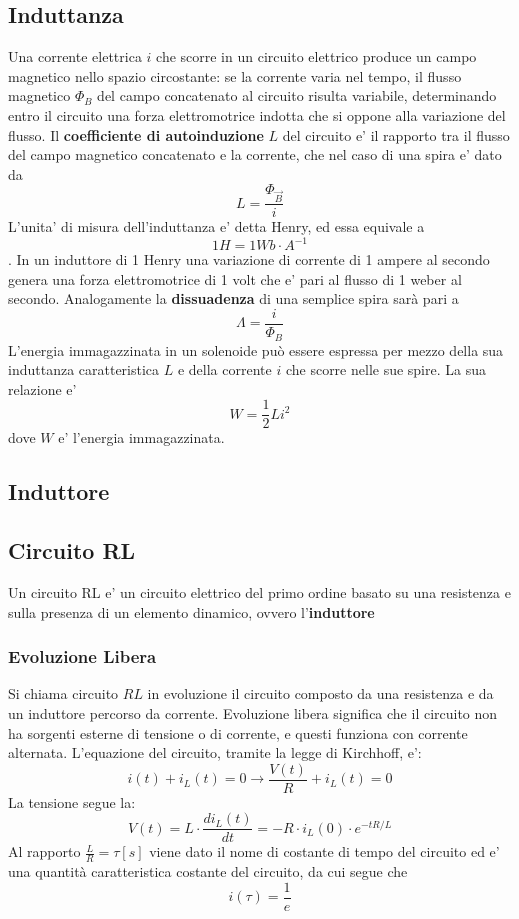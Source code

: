 \documentclass[a4paper, 10pt]{article}
\begin{document}
		\subsection{Induttanza}
			Una corrente elettrica $i$ che scorre in un circuito elettrico produce un campo magnetico nello spazio circostante: se 
			la corrente varia nel tempo, il flusso magnetico $\Phi_B$ del campo concatenato al circuito risulta variabile, 
			determinando entro il circuito una forza elettromotrice indotta che si oppone alla variazione del flusso. 
			Il \textbf{coefficiente di autoinduzione} $L$ del circuito e' il rapporto tra il flusso del campo magnetico concatenato
			e la corrente, che nel caso di una spira e' dato da 
			\[ L = \frac{\Phi_{\overrightarrow{B}}}{i} \] L'unita' di misura dell'induttanza e' detta Henry, ed essa equivale a 
			\[ 1H = 1 Wb \cdot A^{-1} \]. In un induttore di 1 Henry una variazione di corrente di 1 ampere al secondo genera una
			forza elettromotrice di 1 volt che e' pari al flusso di 1 weber al secondo. Analogamente la \textbf{dissuadenza} di una
			semplice spira sarà pari a 
			\[ \Lambda = \frac{i}{\Phi_B} \]
			L'energia immagazzinata in un solenoide può essere espressa per mezzo della sua induttanza caratteristica $L$ e della
			corrente $i$ che scorre nelle sue spire. La sua relazione e' \[ W = \frac{1}{2} Li^2 \] dove $W$ e' 
			l'energia immagazzinata.
		\subsection{Induttore}
		\subsection{Circuito RL}
			Un circuito RL e' un circuito elettrico del primo ordine basato su una resistenza e sulla presenza di 
			un elemento dinamico, ovvero l'\textbf{induttore}
			\subsubsection{Evoluzione Libera}
				Si chiama circuito $RL$ in evoluzione il circuito composto da una resistenza e da un induttore percorso da
				corrente. Evoluzione libera significa che il circuito non ha sorgenti esterne di tensione o di corrente, e questi
				funziona con corrente alternata. L'equazione del circuito, tramite la legge di Kirchhoff, e':
				\[ i(t) + i_L(t) = 0 \rightarrow \frac{V(t)}{R} + i_L (t) = 0 \]
				La tensione segue la: \[ V(t) = L \cdot \frac{di_L (t)}{dt} = -R \cdot i_L (0) \cdot e^{-tR/L} \]
				Al rapporto $\frac{L}{R} = \tau[s]$ viene dato il nome di costante di tempo del circuito ed e' una quantità 
				caratteristica costante del circuito, da cui segue che \[ i(\tau) = \frac{1}{e} \]
\end{document}
